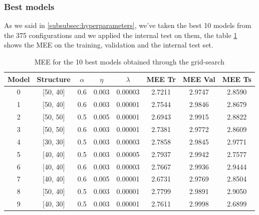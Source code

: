 \subsubsection{Best models}
As we said in \ref{subsubsec:hyperparameters}, we've taken the best 10 models from the 375 configurations and we applied the internal test on them, the table \ref{tab:bestmodels} shows the MEE on the training, validation and the internal test set.
\begin{center}
    \begin{table}[H]
        \centering
        \small
        \begin{tabular}{|c|c|c|c|c|c|c|c|}
            \hline
            \textbf{Model} & \textbf{Structure} & $\alpha$ & $\eta$ & $\lambda$ & \textbf{MEE Tr} & \textbf{MEE Val} & \textbf{MEE Ts} \\ \hline
            
            0 & [50, 40] & 0.6 & 0.003 & 0.00003 & 2.7211 & 2.9747 & 2.8590 \\ \hline
            
            1 & [50, 40] & 0.6 & 0.003 & 0.00001 & 2.7544 & 2.9846 & 2.8679 \\ \hline
            
            2 & [50, 50] & 0.5 & 0.005 & 0.00001 & 2.6943 & 2.9915 & 2.8822 \\ \hline
            
            3 & [50, 50] & 0.6 & 0.003 & 0.00001 & 2.7381 & 2.9772 & 2.8609 \\ \hline
            
            4 & [30, 30] & 0.5 & 0.003 & 0.00003 & 2.7858 & 2.9845 & 2.9771 \\ \hline
            
            5 & [40, 40] & 0.5 & 0.003 & 0.00005 & 2.7937 & 2.9942 & 2.7577 \\ \hline
            
            6 & [40, 40] & 0.6 & 0.003 & 0.00003 & 2.7667 & 2.9936 & 2.9444 \\ \hline
            
            7 & [40, 40] & 0.6 & 0.005 & 0.00001 & 2.6731 & 2.9769 & 2.8504 \\ \hline
            
            8 & [50, 40] & 0.5 & 0.003 & 0.00001 & 2.7799 & 2.9891 & 2.9050 \\ \hline
            
            9 & [40, 30] & 0.5 & 0.003 & 0.00001 & 2.7611 & 2.9998 & 2.6899 \\ \hline
            
            \hline
        \end{tabular}
        \caption{MEE for the 10 best models obtained through the grid-search}
        \label{tab:bestmodels}
    \end{table}
\end{center}
